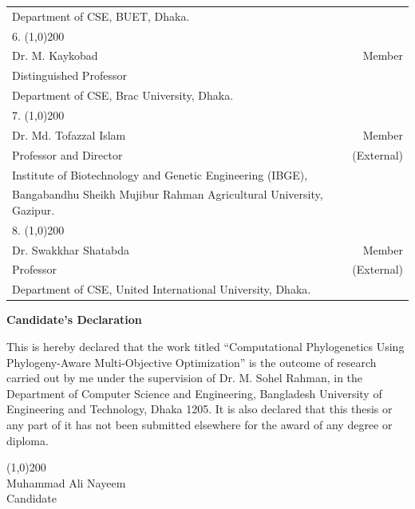 \begin{singlespace}
{\begin{spacing}{0.5}
\begin{tabular}{p{12cm} r }
	Department of CSE, BUET, Dhaka.  & \\
 	\vspace{0.1cm}
 	6. \line(1,0){200} &  \\
 	Dr. M. Kaykobad  & Member\\ 
 	Distinguished Professor & \\
 	Department of CSE, Brac University, Dhaka.  & \\
 	\vspace{0.1cm}
 	7. \line(1,0){200} &  \\
 	Dr. Md. Tofazzal Islam & Member\\ 
 	Professor and Director  & (External)\\
 	Institute of Biotechnology and Genetic Engineering (IBGE), & \\ 
 	Bangabandhu Sheikh Mujibur Rahman Agricultural University, Gazipur. & \\
 	\vspace{0.1cm}
 	8. \line(1,0){200} &  \\
 	Dr. Swakkhar Shatabda & Member\\ 
 	Professor  & (External)\\
 	Department of CSE, United International University, Dhaka. & \\
 \end{tabular}
 \end{spacing}
}
\end{singlespace}
 \newpage
 \begin{center}
 \LARGE \textbf{Candidate's Declaration}
 \end{center}
 \vspace{3cm}
 This is hereby declared that the work titled ``Computational Phylogenetics Using Phylogeny-Aware Multi-Objective Optimization'' is the outcome of research carried out by me under the supervision of Dr. M. Sohel Rahman, in the Department of Computer Science and Engineering,
 Bangladesh University of Engineering and Technology, Dhaka 1205. 
 It is also declared that this thesis or any part of it has not been submitted elsewhere for the award of any degree or diploma. \\
 \vspace{4cm}
\begin{center}
 \line(1,0){200}\\
 \large
 Muhammad Ali Nayeem \\
 Candidate
\end{center}
 

 
 
 